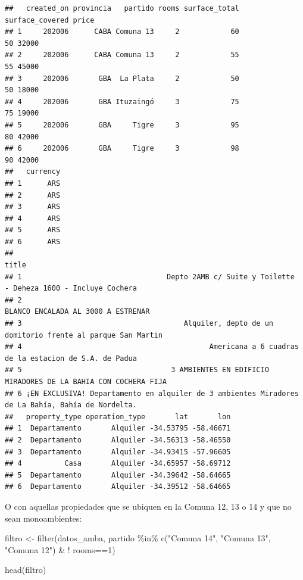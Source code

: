 \documentclass[
  spanish,
]{book}
\newenvironment{Shaded}{\begin{snugshade}}{\end{snugshade}}
\newcommand{\DecValTok}[1]{\textcolor[rgb]{0.00,0.00,0.81}{#1}}
\newcommand{\FunctionTok}[1]{\textcolor[rgb]{0.00,0.00,0.00}{#1}}
\newcommand{\NormalTok}[1]{#1}
\newcommand{\OtherTok}[1]{\textcolor[rgb]{0.56,0.35,0.01}{#1}}
\newcommand{\SpecialCharTok}[1]{\textcolor[rgb]{0.00,0.00,0.00}{#1}}
\newcommand{\StringTok}[1]{\textcolor[rgb]{0.31,0.60,0.02}{#1}}
\begin{document}
\begin{verbatim}
##   created_on provincia   partido rooms surface_total surface_covered price
## 1     202006      CABA Comuna 13     2            60              50 32000
## 2     202006      CABA Comuna 13     2            55              55 45000
## 3     202006       GBA  La Plata     2            50              50 18000
## 4     202006       GBA Ituzaingó     3            75              75 19000
## 5     202006       GBA     Tigre     3            95              80 42000
## 6     202006       GBA     Tigre     3            98              90 42000
##   currency
## 1      ARS
## 2      ARS
## 3      ARS
## 4      ARS
## 5      ARS
## 6      ARS
##                                                                                              title
## 1                                  Depto 2AMB c/ Suite y Toilette  - Deheza 1600 - Incluye Cochera
## 2                                                               BLANCO ENCALADA AL 3000 A ESTRENAR
## 3                                      Alquiler, depto de un domitorio frente al parque San Martin
## 4                                            Americana a 6 cuadras de la estacion de S.A. de Padua
## 5                                   3 AMBIENTES EN EDIFICIO MIRADORES DE LA BAHIA CON COCHERA FIJA
## 6 ¡EN EXCLUSIVA! Departamento en alquiler de 3 ambientes Miradores de La Bahía, Bahía de Nordelta.
##   property_type operation_type       lat       lon
## 1  Departamento       Alquiler -34.53795 -58.46671
## 2  Departamento       Alquiler -34.56313 -58.46550
## 3  Departamento       Alquiler -34.93415 -57.96605
## 4          Casa       Alquiler -34.65957 -58.69712
## 5  Departamento       Alquiler -34.39642 -58.64665
## 6  Departamento       Alquiler -34.39512 -58.64665
\end{verbatim}

O con aquellas propiedades que se ubiquen en la Comuna 12, 13 o 14 y que no sean monoambientes:

\begin{Shaded}
\begin{Highlighting}[]
\NormalTok{filtro }\OtherTok{\textless{}{-}} \FunctionTok{filter}\NormalTok{(datos\_amba, partido }\SpecialCharTok{\%in\%} \FunctionTok{c}\NormalTok{(}\StringTok{"Comuna 14"}\NormalTok{, }\StringTok{"Comuna 13"}\NormalTok{, }\StringTok{"Comuna 12"}\NormalTok{) }\SpecialCharTok{\&} \SpecialCharTok{!}\NormalTok{ rooms}\SpecialCharTok{==}\DecValTok{1}\NormalTok{)}

\FunctionTok{head}\NormalTok{(filtro)}
\end{Highlighting}
\end{Shaded}
\end{document}

